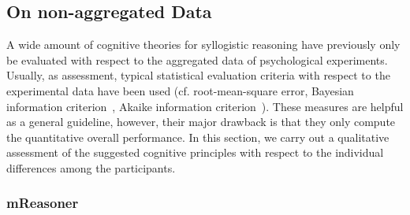 \documentclass[12pt]{article}
\begin{document}
\subsection{On non-aggregated Data} \label{sect:nonag}

A wide amount of cognitive theories for syllogistic reasoning have previously only be evaluated with respect to the aggregated data of psychological experiments.
Usually, as assessment, typical statistical evaluation criteria with respect to the experimental data 
 have been used (cf. root-mean-square error, Bayesian information criterion~\cite{schwarz1978}, Akaike information criterion~\cite{akaike1974new}).
 These measures are helpful as a general guideline, however, their major drawback is that they only compute the quantitative overall performance.
 In this section, we carry out a qualitative assessment of the suggested cognitive principles with respect to the individual differences
  among the participants.

\subsubsection{mReasoner}
\end{document}
